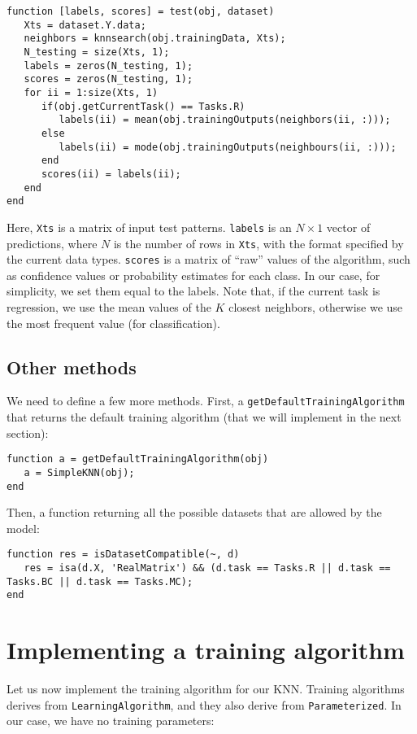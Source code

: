 \begin{lstlisting}
function [labels, scores] = test(obj, dataset)
   Xts = dataset.Y.data;
   neighbors = knnsearch(obj.trainingData, Xts);
   N_testing = size(Xts, 1);
   labels = zeros(N_testing, 1);
   scores = zeros(N_testing, 1);
   for ii = 1:size(Xts, 1)
      if(obj.getCurrentTask() == Tasks.R)
         labels(ii) = mean(obj.trainingOutputs(neighbors(ii, :)));
      else
         labels(ii) = mode(obj.trainingOutputs(neighbours(ii, :)));
      end
      scores(ii) = labels(ii);
   end
end
\end{lstlisting}

Here, \verb|Xts| is a matrix of input test patterns. \verb|labels| is an $N \times 1$ vector of predictions, where $N$ is the number of rows in \verb|Xts|, with the format specified by the current data types. \verb|scores| is a matrix of ``raw'' values of the algorithm, such as confidence values or probability estimates for each class. In our case, for simplicity, we set them equal to the labels. Note that, if the current task is regression, we use the mean values of the $K$ closest neighbors, otherwise we use the most frequent value (for classification).

\subsection{Other methods}

We need to define a few more methods. First, a \verb|getDefaultTrainingAlgorithm| that returns the default training algorithm (that we will implement in the next section):

\begin{lstlisting}
function a = getDefaultTrainingAlgorithm(obj)
   a = SimpleKNN(obj);
end
\end{lstlisting}

\noindent Then, a function returning all the possible datasets that are allowed by the model:

\begin{lstlisting}
function res = isDatasetCompatible(~, d)
   res = isa(d.X, 'RealMatrix') && (d.task == Tasks.R || d.task == Tasks.BC || d.task == Tasks.MC);
end
\end{lstlisting}

\section{Implementing a training algorithm}

Let us now implement the training algorithm for our KNN. Training algorithms derives from \verb|LearningAlgorithm|, and they also derive from \verb|Parameterized|. In our case, we have no training parameters:


